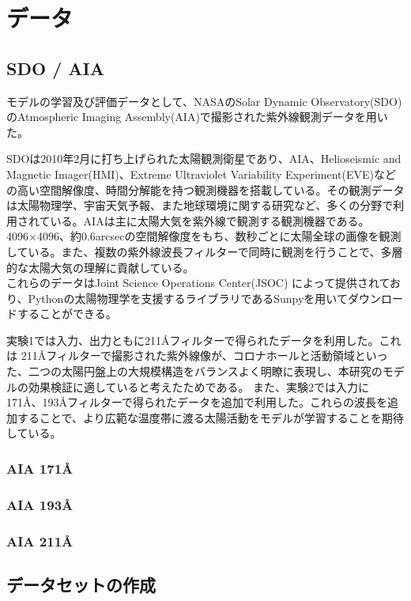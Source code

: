 \chapter{データ} 

\section{SDO / AIA}
モデルの学習及び評価データとして、NASAのSolar Dynamic Observatory(SDO)\cite{pesnell2012solar}のAtmospheric Imaging Assembly(AIA)で撮影された紫外線観測データを用いた。

SDOは2010年2月に打ち上げられた太陽観測衛星であり、AIA、Helioseismic and Magnetic Imager(HMI)、Extreme Ultraviolet Variability Experiment(EVE)などの高い空間解像度、時間分解能を持つ観測機器を搭載している。その観測データは太陽物理学、宇宙天気予報、また地球環境に関する研究など、多くの分野で利用されている。AIAは主に太陽大気を紫外線で観測する観測機器である。4096×4096、約0.6arcsecの空間解像度をもち、数秒ごとに太陽全球の画像を観測している。また、複数の紫外線波長フィルターで同時に観測を行うことで、多層的な太陽大気の理解に貢献している。\\
これらのデータはJoint Science Operations Center(JSOC) によって提供されており、Pythonの太陽物理学を支援するライブラリであるSunpyを用いてダウンロードすることができる。

実験1では入力、出力ともに211Åフィルターで得られたデータを利用した。これは 211Åフィルターで撮影された紫外線像が、コロナホールと活動領域といった、二つの太陽円盤上の大規模構造をバランスよく明瞭に表現し、本研究のモデルの効果検証に適していると考えたためである。
また、実験2では入力に171Å、193Åフィルターで得られたデータを追加で利用した。これらの波長を追加することで、より広範な温度帯に渡る太陽活動をモデルが学習することを期待している。

\subsection{AIA 171Å}
\subsection{AIA 193Å}
\subsection{AIA 211Å}


\section{データセットの作成}

